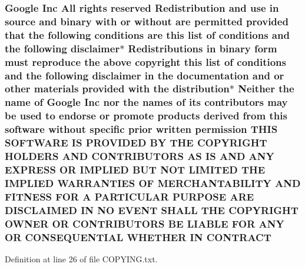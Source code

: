 \subsubsection[{\texorpdfstring{C\+O\+N\+T\+R\+A\+CT}{CONTRACT}}]{\setlength{\rightskip}{0pt plus 5cm}Google Inc All rights reserved Redistribution and use in source and binary with or without are permitted provided that the following conditions are this {\bf list} of conditions and the following disclaimer$\ast$ Redistributions in binary form must reproduce the above copyright this {\bf list} of conditions and the following disclaimer in the documentation and or other materials provided with the distribution$\ast$ Neither the name of Google Inc nor the names of its contributors may be used to endorse or promote products derived from this software without specific prior written permission T\+H\+IS S\+O\+F\+T\+W\+A\+RE IS P\+R\+O\+V\+I\+D\+ED BY T\+HE C\+O\+P\+Y\+R\+I\+G\+HT H\+O\+L\+D\+E\+RS A\+ND C\+O\+N\+T\+R\+I\+B\+U\+T\+O\+RS AS IS A\+ND A\+NY E\+X\+P\+R\+E\+SS OR I\+M\+P\+L\+I\+ED B\+UT N\+OT L\+I\+M\+I\+T\+ED T\+HE I\+M\+P\+L\+I\+ED {\bf W\+A\+R\+R\+A\+N\+T\+I\+ES} OF M\+E\+R\+C\+H\+A\+N\+T\+A\+B\+I\+L\+I\+TY A\+ND F\+I\+T\+N\+E\+SS F\+OR A P\+A\+R\+T\+I\+C\+U\+L\+AR P\+U\+R\+P\+O\+SE A\+RE D\+I\+S\+C\+L\+A\+I\+M\+ED IN NO E\+V\+E\+NT S\+H\+A\+LL T\+HE C\+O\+P\+Y\+R\+I\+G\+HT O\+W\+N\+ER OR C\+O\+N\+T\+R\+I\+B\+U\+T\+O\+RS BE L\+I\+A\+B\+LE F\+OR A\+NY OR C\+O\+N\+S\+E\+Q\+U\+E\+N\+T\+I\+AL W\+H\+E\+T\+H\+ER IN C\+O\+N\+T\+R\+A\+CT}\hypertarget{COPYING_8txt_ae5f46c55ceb68d912e61fe0ba637a1c9}{}\label{COPYING_8txt_ae5f46c55ceb68d912e61fe0ba637a1c9}


Definition at line 26 of file C\+O\+P\+Y\+I\+N\+G.\+txt.

